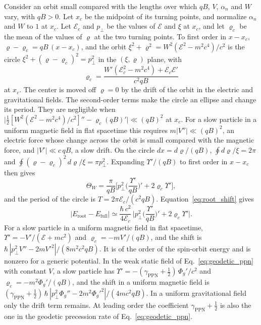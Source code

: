 \documentclass[aps,prd,onecolumn,tightenlines,nofootinbib,notitlepage,11pt,floatfix]{revtex4-2}
\theoremstyle{indentedtheorem}
\begin{document}
Consider an orbit small compared with the lengths over which $qB$, $V$, $\alpha_n$ and $W$ vary, with $qB>0$. Let $x_c$ be the midpoint of its turning points, and normalize $\alpha_n$ and $W$ to $1$ at $x_c$. Let $\mathcal{E}_c$ and $p_\perp$ be the values of $\mathcal{E}$ and $\xi$ at $x_c$, and let $\varrho_c$ be the mean of the values of $\varrho$ at the two turning points. To first order in $x-x_c$, $\varrho-\varrho_c=qB\,(x-x_c)$, and the orbit $\xi^2+\varrho^2=W^2(\mathcal{E}^2-m^2c^4)/c^2$ is the circle $\xi^2+(\varrho-\varrho_c)^2=p_\perp^2$ in the $(\xi,\varrho)$ plane, with
\begin{equation*}
    \varrho_c = \frac{W'(\mathcal{E}_c^2-m^2c^4)+\mathcal{E}_c\mathcal{E}'}{c^2qB}
\end{equation*}
at $x_c$. The center is moved off $\varrho=0$ by the drift of the orbit in the electric and gravitational fields. The second-order terms make the circle an ellipse and change its period. They are negligible when $\big|\tfrac{1}{2}[W^2(\mathcal{E}^2-m^2c^4)/c^2]''-\varrho_c(qB)'\big|\ll(qB)^2$ at $x_c$. For a slow particle in a uniform magnetic field in flat spacetime this requires $m|V''|\ll(qB)^2$, an electric force whose change across the orbit is small compared with the magnetic force, and $|V'|\ll c\,qB$, a slow drift. On the circle $dx=d\varrho/(qB)$, $\oint d\varrho/\xi=2\pi$ and $\oint(\varrho-\varrho_c)^2\,d\varrho/\xi=\pi p_\perp^2$. Expanding $\Upsilon'/(qB)$ to first order in $x-x_c$ then gives
\begin{equation*}
    \Theta_W = \frac{\pi}{qB}\Big[p_\perp^2\Big(\frac{\Upsilon'}{qB}\Big)'+2\varrho_c\Upsilon'\Big] ,
\end{equation*}
and the period of the circle is $T=2\pi\mathcal{E}_c/(c^2qB)$. Equation~\eqref{eq:root_shift} gives
\begin{equation*}
    |E_\text{root}-E_\text{full}| \simeq \frac{\hbar\,c^2}{4\mathcal{E}_c}\,\Big|p_\perp^2\Big(\frac{\Upsilon'}{qB}\Big)'+2\varrho_c\Upsilon'\Big| .
\end{equation*}
For a slow particle in a uniform magnetic field in flat spacetime, $\Upsilon'=-V'/(\mathcal{E}+mc^2)$ and $\varrho_c=-mV'/(qB)$, and the shift is $\hbar\,|p_\perp^2V''-2mV'^2|/(8m^2c^2qB)$. It is of the order of the spin-orbit energy and is nonzero for a generic potential. In the weak static field of Eq.~\eqref{eq:geodetic_ppn} with constant $V$, a slow particle has $\Upsilon'=-(\gamma_\text{PPN}+\tfrac{1}{2})\,\Phi_g'/c^2$ and $\varrho_c=-m^2\Phi_g'/(qB)$, and the shift in a uniform magnetic field is $(\gamma_\text{PPN}+\tfrac{1}{2})\,\hbar\,|p_\perp^2\Phi_g''-2m^2\Phi_g'^2|/(4mc^2qB)$. In a uniform gravitational field only the drift term remains. At leading order the coefficient $\gamma_\text{PPN}+\tfrac{1}{2}$ is also the one in the geodetic precession rate of Eq.~\eqref{eq:geodetic_ppn}.
\end{document}
